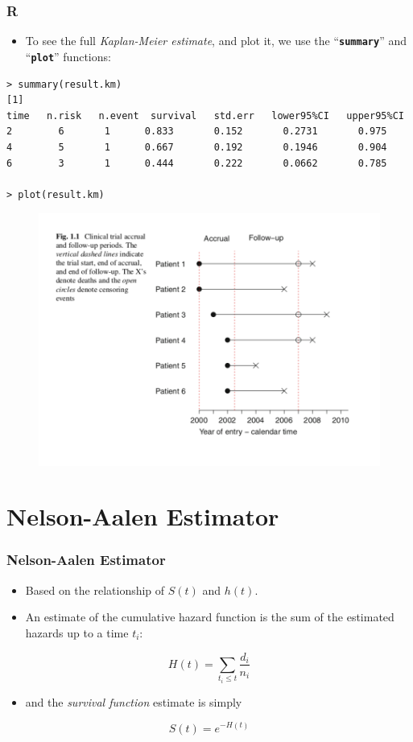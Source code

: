 \documentclass{beamer}
\newcommand{\empr}[1]{{\emph{\color{red}#1}}}
\newcommand{\pkg}[1]{{\textbf{\texttt{#1}}}}
\begin{document}
\pagebreak
\begin{frame}[fragile]
\frametitle{R}
\begin{itemize}
\item To see the full \empr{Kaplan-Meier estimate}, and plot it, we use the  ``\pkg{summary}'' and ``\pkg{plot}'' functions:
\end{itemize}

\begin{Verbatim}
> summary(result.km)
[1]
time   n.risk   n.event  survival   std.err   lower95%CI   upper95%CI
2        6       1      0.833       0.152       0.2731       0.975
4        5       1      0.667       0.192       0.1946       0.904
6        3       1      0.444       0.222       0.0662       0.785

> plot(result.km)
\end{Verbatim}
\begin{figure}[h!]
	\includegraphics[scale = .25]{003.png}
\end{figure}
\end{frame}

\section{Nelson-Aalen Estimator}
\begin{frame}
\frametitle{Nelson-Aalen Estimator}
\begin{itemize}
\item Based on the {\color{red}relationship} of {\color{red}$S(t)$} and {\color{red}$h(t)$}. 
\item An estimate of the cumulative hazard function is the {\color{red}sum} of the estimated {\color{red}hazards up to a time $t_i$}: 
\end{itemize}
\begin{equation}
H(t) =  \sum\limits_{t_i\le t}^{}\frac{d_i}{n_i}
\end{equation}
\begin{itemize}
\item and the \empr{survival function} estimate is simply
\end{itemize}
\begin{equation}
S(t) =  e^{-H(t)}
\end{equation}
\end{frame}	
\end{document}
